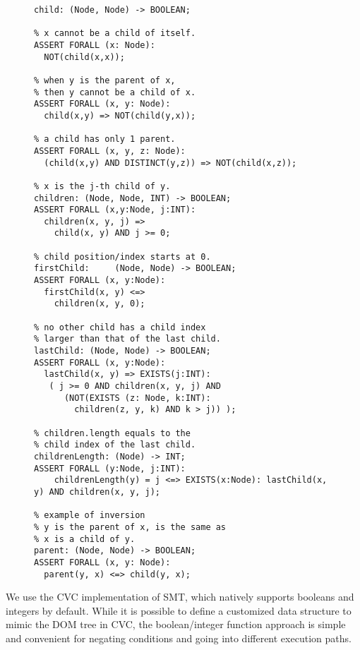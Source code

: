 \begin{figure}
\begin{lstlisting}[caption=SMT functions for defining the children.length DOM operation.  We start with defining the parent-child relationships; then move on to the ordering of children; then use the child index of the last child to define and quantify the {\tt childrenLength()} boolean function,label=childrenLength]  
% child(x, y): x is a child of y.
child: (Node, Node) -> BOOLEAN;	

% x cannot be a child of itself.
ASSERT FORALL (x: Node):	
  NOT(child(x,x));
	
% when y is the parent of x,
% then y cannot be a child of x.  
ASSERT FORALL (x, y: Node):
  child(x,y) => NOT(child(y,x));
  
% a child has only 1 parent.
ASSERT FORALL (x, y, z: Node):
  (child(x,y) AND DISTINCT(y,z)) => NOT(child(x,z));

% x is the j-th child of y.
children: (Node, Node, INT) -> BOOLEAN;
ASSERT FORALL (x,y:Node, j:INT): 
  children(x, y, j) => 
    child(x, y) AND j >= 0;

% child position/index starts at 0.
firstChild:		(Node, Node) -> BOOLEAN;
ASSERT FORALL (x, y:Node):
  firstChild(x, y) <=> 
    children(x, y, 0);

% no other child has a child index 
% larger than that of the last child.
lastChild: (Node, Node) -> BOOLEAN;	
ASSERT FORALL (x, y:Node): 	
  lastChild(x, y) => EXISTS(j:INT): 
   ( j >= 0 AND children(x, y, j) AND 
      (NOT(EXISTS (z: Node, k:INT): 
	    children(z, y, k) AND k > j)) );

% children.length equals to the
% child index of the last child.
childrenLength:	(Node) -> INT;
ASSERT FORALL (y:Node, j:INT):
	childrenLength(y) = j <=> EXISTS(x:Node): lastChild(x, y) AND children(x, y, j);

% example of inversion
% y is the parent of x, is the same as 
% x is a child of y.
parent: (Node, Node) -> BOOLEAN; 
ASSERT FORALL (x, y: Node): 
  parent(y, x) <=> child(y, x); 
\end{lstlisting} 
\end{figure}

We use the CVC implementation of SMT, which natively supports booleans and integers by default.  
While it is possible to define a customized data structure to mimic the DOM tree in CVC, the boolean/integer function approach is simple and convenient for negating conditions and going into different execution paths.

